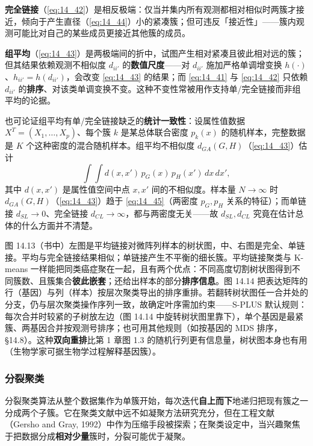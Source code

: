 \textbf{完全链接}（\eqref{eq:14_42}）是相反极端：仅当并集内所有观测都相对相似时两簇才接近，倾向于产生直径（\eqref{eq:14_44}）小的紧凑簇；但可违反「接近性」——簇内观测可能比对自己的某些成员更接近其他簇的成员。

\textbf{组平均}（\eqref{eq:14_43}）是两极端间的折中，试图产生相对紧凑且彼此相对远的簇；但其结果依赖观测不相似度 $d_{ii'}$ 的\textbf{数值尺度}——对 $d_{ii'}$ 施加严格单调增变换 $h(\cdot)$、$h_{ii'}=h(d_{ii'})$，会改变 \eqref{eq:14_43} 的结果；而 \eqref{eq:14_41} 与 \eqref{eq:14_42} 只依赖 $d_{ii'}$ 的\textbf{排序}、对该类单调变换不变。这种不变性常被用作支持单/完全链接而非组平均的论据。

也可论证组平均有单/完全链接缺乏的\textbf{统计一致性}：设属性值数据 $X^T=(X_1,\dots,X_p)$、每个簇 $k$ 是某总体联合密度 $p_k(x)$ 的随机样本，完整数据是 $K$ 个这种密度的混合随机样本。组平均不相似度 $d_{GA}(G,H)$（\eqref{eq:14_43}）估计
\begin{equation}
\int\!\!\int d(x,x')\,p_G(x)\,p_H(x')\,dx\,dx', \label{eq:14_45}
\end{equation}
其中 $d(x,x')$ 是属性值空间中点 $x,x'$ 间的不相似度。样本量 $N\to\infty$ 时 $d_{GA}(G,H)$（\eqref{eq:14_43}）趋于 \eqref{eq:14_45}（两密度 $p_G,p_H$ 关系的特征）；而单链接 $d_{SL}\to 0$、完全链接 $d_{CL}\to\infty$，都与两密度无关——故 $d_{SL},d_{CL}$ 究竟在估计总体的什么方面并不清楚。

\begin{example}[人类癌症微阵列（续）]
图 14.13（书中）左图是平均链接对微阵列样本的树状图，中、右图是完全、单链接。平均与完全链接结果相似；单链接产生不平衡的细长簇。平均链接聚类与 K-means 一样能把同类癌症聚在一起，且有两个优点：不同高度切割树状图得到不同簇数、且簇集合\textbf{彼此嵌套}；还给出样本的部分\textbf{排序信息}。图 14.14 把表达矩阵的行（基因）与列（样本）按层次聚类导出的排序重排。若翻转树状图任一合并处的分支，仍与层次聚类操作序列一致，故确定叶序需加约束——S-PLUS 默认规则：每次合并时较紧的子树放左边（图 14.14 中旋转树状图里靠下），单个基因是最紧簇、两基因合并按观测号排序；也可用其他规则（如按基因的 MDS 排序，§14.8）。这种\textbf{双向重排}比第 1 章图 1.3 的随机行列更有信息量，树状图本身也有用（生物学家可据生物学过程解释基因簇）。
\end{example}

\subsubsection{分裂聚类}

分裂聚类算法从整个数据集作为单簇开始，每次迭代\textbf{自上而下}地递归把现有簇之一分成两个子簇。它在聚类文献中远不如凝聚方法研究充分，但在工程文献（Gersho and Gray, 1992）中作为压缩手段被探索；在聚类设定中，当兴趣聚焦于把数据分成\textbf{相对少量}簇时，分裂可能优于凝聚。

